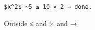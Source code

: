 \documentclass{article}
\begin{document}
\begin{Verbatim}
$x^2$ ~5 ≤ 10 × 2 → done.
\end{Verbatim}
Outside ≤ and × and →.
\end{document}
